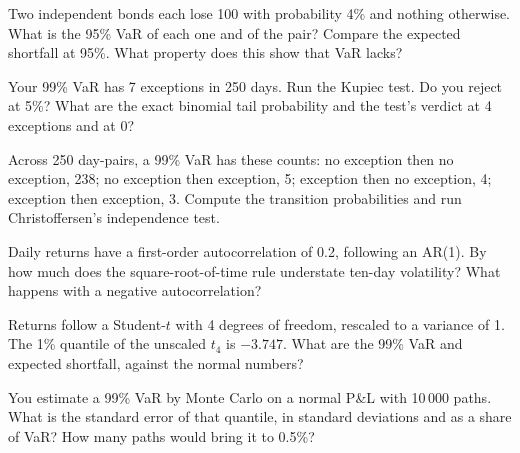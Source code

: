 \begin{question}\label{iq:iv2:risk-validation-and-regulation:11}
Two independent bonds each lose 100 with probability 4\% and nothing otherwise. What is the 95\% VaR of each one and of the pair? Compare the expected shortfall at 95\%. What property does this show that VaR lacks?
\end{question}

\begin{question}\label{iq:iv2:risk-validation-and-regulation:12}
Your 99\% VaR has 7 exceptions in 250 days. Run the Kupiec test. Do you reject at 5\%? What are the exact binomial tail probability and the test's verdict at 4 exceptions and at 0?
\end{question}

\begin{question}\label{iq:iv2:risk-validation-and-regulation:13}
Across 250 day-pairs, a 99\% VaR has these counts: no exception then no exception, 238; no exception then exception, 5; exception then no exception, 4; exception then exception, 3. Compute the transition probabilities and run Christoffersen's independence test.
\end{question}

\begin{question}\label{iq:iv2:risk-validation-and-regulation:14}
Daily returns have a first-order autocorrelation of 0.2, following an AR(1). By how much does the square-root-of-time rule understate ten-day volatility? What happens with a negative autocorrelation?
\end{question}

\begin{question}\label{iq:iv2:risk-validation-and-regulation:15}
Returns follow a Student-$t$ with 4 degrees of freedom, rescaled to a variance of 1. The 1\% quantile of the unscaled $t_4$ is $-3.747$. What are the 99\% VaR and expected shortfall, against the normal numbers?
\end{question}

\begin{question}\label{iq:iv2:risk-validation-and-regulation:16}
You estimate a 99\% VaR by Monte Carlo on a normal P\&L with 10\,000 paths. What is the standard error of that quantile, in standard deviations and as a share of VaR? How many paths would bring it to 0.5\%?
\end{question}

